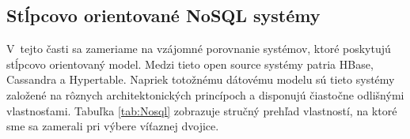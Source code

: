 \documentclass[11pt,twoside,a4paper]{book}
\begin{document}
\subsection*{Stĺpcovo orientované NoSQL systémy}
V~tejto časti sa zameriame na vzájomné porovnanie systémov, ktoré poskytujú stĺpcovo orientovaný model. Medzi tieto open source systémy patria HBase, Cassandra a Hypertable. Napriek totožnému dátovému modelu sú tieto systémy založené na rôznych architektonických princípoch a disponujú čiastočne odlišnými vlastnosťami. Tabuľka \ref{tab:Nosql} zobrazuje stručný prehľad vlastností, na ktoré sme sa zamerali pri výbere víťaznej dvojice.


% 
\end{document}
